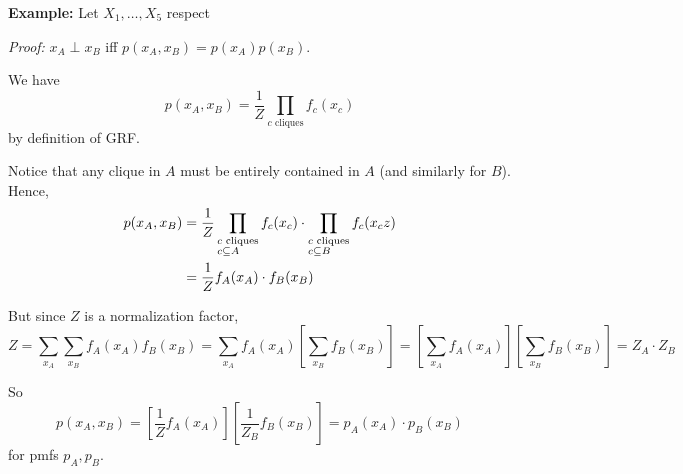 \documentclass[12pt]{report}
\newcommand{\sub}{\subseteq}
\newcommand*{\tbf}[1]{\ifmmode\mathbf{#1}\else\textbf{#1}\fi}
\newenvironment*{tbox}[2][gray]{
    \begin{tcolorbox}[
        parbox=false,
        colback=#1!5!white,
        colframe=#1!75!black,
        breakable,
        title={#2}
    ]}
    {\end{tcolorbox}}
\begin{document}
\tbf{Example:} Let $X_1, \dots, X_5$ respect

\begin{center}
\end{center}

\begin{tbox}{\textbf{Claim:} $(X_1, X_2, X_3) \perp (X_4, X_5)$}
    \emph{Proof:} $x_A \perp x_B$ iff $p(x_A, x_B) = p(x_A)p(x_B)$.

    We have
    \[p(x_A, x_B) = \frac{1}{Z} \prod_{c \text{ cliques}} f_c(x_c)\]
    by definition of GRF.

    Notice that any clique in $A$ must be entirely contained in $A$ (and similarly for $B$). Hence,
    \begin{align*}
        p(x_A, x_B) & = \frac{1}{Z} \prod_{\begin{subarray}{gather*}
                                                   c \text{ cliques}\\
                                                   c \sub A
                                               \end{subarray}} f_c(x_c) \cdot \prod_{\begin{subarray}{gather*}
                                                                                         c \text{ cliques}\\
                                                                                         c \sub B
                                                                                     \end{subarray}} f_c(x_cz) \\
                    & = \frac{1}{Z} f_A(x_A) \cdot f_B(x_B)
    \end{align*}

    But since $Z$ is a normalization factor,
    \[Z = \sum_{x_A} \sum_{x_B} f_A(x_A) f_B(x_B) = \sum_{x_A} f_A(x_A) \left[\sum_{x_B} f_B(x_B)\right]= \left[\sum_{x_A} f_A(x_A)\right] \left[\sum_{x_B} f_B(x_B)\right] = Z_A \cdot Z_B\]

    So
    \[p(x_A, x_B) = \left[\frac{1}{Z} f_A(x_A)\right] \left[\frac{1}{Z_B} f_B(x_B)\right] = p_A(x_A) \cdot p_B(x_B)\]
    for pmfs $p_A, p_B$.

\end{tbox}
\end{document}
